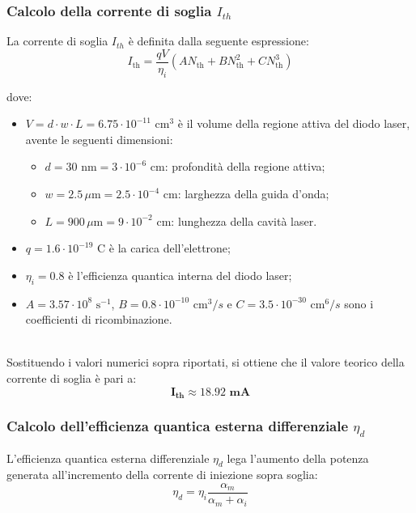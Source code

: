\newpage

\subsubsection{Calcolo della corrente di soglia $I_{th}$}
La corrente di soglia $I_{th}$ è definita dalla seguente espressione:
\begin{equation}
I_{\text{th}} = \dfrac{q V}{\eta_i} \left( A N_{\text{th}} + B N_{\text{th}}^2 + C N_{\text{th}}^3 \right)
\end{equation}

\noindent dove:
\begin{itemize}
    \item $V = d \cdot w \cdot L = 6.75 \cdot 10^{-11} \text{ cm}^3$ è il volume della regione attiva del diodo laser,\\ avente le seguenti dimensioni:
    \begin{itemize}
        \item $d = 30 \text{ nm} = 3 \cdot 10^{-6} \text{ cm}$: profondità della regione attiva;
        \item $w = 2.5 \,\mu \text{m} = 2.5 \cdot 10^{-4} \text{ cm}$: larghezza della guida d'onda;
        \item $L = 900 \,\mu \text{m} = 9 \cdot 10^{-2} \text{ cm}$: lunghezza della cavità laser.
    \end{itemize}
     
    \item $q = 1.6 \cdot 10^{-19} \text{ C}$ è la carica dell'elettrone;
    \item $\eta_i = 0.8$ è l'efficienza quantica interna del diodo laser;
    \item $A = 3.57 \cdot 10^8 \text{ s}^{-1}$, $B = 0.8 \cdot 10^{-10} \text{ cm}^3/s$ e $C = 3.5 \cdot 10^{-30} \text{ cm}^6/s$ sono i coefficienti di ricombinazione.
\end{itemize}


\noindent\\ Sostituendo i valori numerici sopra riportati, si ottiene che il valore teorico della corrente di soglia è pari a:
\[
    \boldsymbol{I_{\text{th}} \approx 18.92 \textbf{ mA}}
\]

\subsubsection{Calcolo dell'efficienza quantica esterna differenziale $\eta_d$}
\noindent L'efficienza quantica esterna differenziale $\eta_d$ lega l'aumento della potenza generata all'incremento della corrente di iniezione sopra soglia:
\begin{equation}
\eta_d = \eta_i \frac{\alpha_m}{\alpha_m + \alpha_i}
\end{equation}


